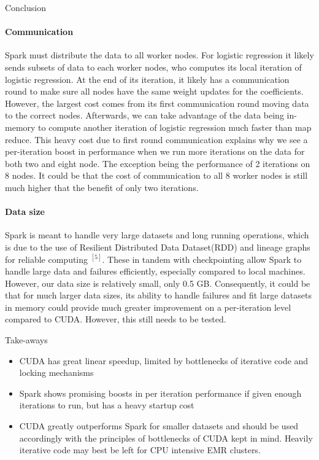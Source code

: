 \documentclass[11pt]{article}
\begin{document}
\begin{section}{Conclusion}
	\paragraph{Communication} Spark must distribute the data to all worker nodes. For logistic regression it likely sends subsets of data to each worker nodes, who computes its local iteration of logistic regression. At the end of its iteration, it likely has a communication round to make sure all nodes have the same weight updates for the coefficients. However, the largest cost comes from its first communication round moving data to the correct nodes. Afterwards, we can take advantage of the data being in-memory to compute another iteration of logistic regression much faster than map reduce. This heavy cost due to first round communication explains why we see a per-iteration boost in performance when we run more iterations on the data for both two and eight node. The exception being the performance of 2 iterations on 8 nodes. It could be that the cost of communication to all 8 worker nodes is still much higher that the benefit of only two iterations. 
	
	\paragraph{Data size} Spark is meant to handle very large datasets and long running operations, which is due to the use of Resilient Distributed Data Dataset(RDD) and lineage graphs for reliable computing $^{[5]}$. These in tandem with checkpointing allow Spark to handle large data and failures efficiently, especially compared to local machines. However, our data size is relatively small, only 0.5 GB. Consequently, it could be that for much larger data sizes, its ability to handle failures and fit large datasets in memory could provide much greater improvement on a per-iteration level compared to CUDA. However, this still needs to be tested.
	
	\begin{subsection}{Take-aways}
		\begin{itemize}
			\item CUDA has great linear speedup, limited by bottlenecks of iterative code and locking mechanisms
			\item Spark shows promising boosts in per iteration performance if given enough iterations to run, but has a heavy startup cost
			\item CUDA greatly outperforms Spark for smaller datasets and should be used accordingly with the principles of bottlenecks of CUDA kept in mind. Heavily iterative code may best be left for CPU intensive EMR clusters.
		\end{itemize}	
	\end{subsection}
	
\end{section}
\end{document}
